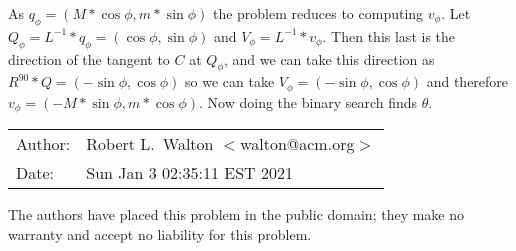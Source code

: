\documentclass[12pt]{article}
\begin{document}
As $q_\phi = (M*\cos\phi,m*\sin\phi)$ the problem reduces to computing $v_\phi$.
Let $Q_\phi = L^{-1}*q_\phi = (\cos\phi,\sin\phi)$ and
$V_\phi=L^{-1}*v_\phi$.  Then this last is the direction of the tangent
to $C$ at $Q_\phi$, and we can take this direction as
$R^{90}*Q=(-\sin\phi,\cos\phi)$ so we can take
$V_\phi=(-\sin\phi,\cos\phi)$ and therefore $v_\phi=(-M*\sin\phi,m*\cos\phi)$.
Now doing the binary search finds $\theta$.



\bigskip

\begin{tabular}{ll}
Author:	      & Robert L.~Walton $<$walton@acm.org$>$ \\
Date:         & Sun Jan  3 02:35:11 EST 2021

\end{tabular}

The authors have placed this problem in the public domain;
they make no warranty and accept no liability for this problem.
\end{document}
